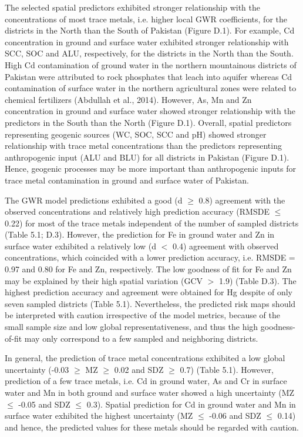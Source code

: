 The selected spatial predictors exhibited stronger relationship with the concentrations of most trace metals, i.e. higher local GWR coefficients, for the districts in the North than the South of Pakistan (Figure D.1). For example, Cd concentration in ground and surface water exhibited stronger relationship with SCC, SOC and ALU, respectively, for the districts in the North than the South. High Cd contamination of ground water in the northern mountainous districts of Pakistan were attributed to rock phosphates that leach into aquifer whereas Cd contamination of surface water in the northern agricultural zones were related to chemical fertilizers (Abdullah et al., 2014). However, As, Mn and Zn concentration in ground and surface water showed stronger relationship with the predictors in the South than the North (Figure D.1). Overall, spatial predictors representing geogenic sources (WC, SOC, SCC and pH) showed stronger relationship with trace metal concentrations than the predictors representing anthropogenic input (ALU and BLU) for all districts in Pakistan (Figure D.1). Hence, geogenic processes may be more important than anthropogenic inputs for trace metal contamination in ground and surface water of Pakistan.

The GWR model predictions exhibited a good (d $\geq$ 0.8) agreement with the observed concentrations and relatively high prediction accuracy (RMSDE $\leq$ 0.22) for most of the trace metals independent of the number of sampled districts (Table 5.1; D.3). However, the prediction for Fe in ground water and Zn in surface water exhibited a relatively low (d $<$ 0.4) agreement with observed concentrations, which coincided with a lower prediction accuracy, i.e. RMSDE = 0.97 and 0.80 for Fe and Zn, respectively. The low goodness of fit for Fe and Zn may be explained by their high spatial variation (GCV $>$ 1.9) (Table D.3).  The highest prediction accuracy and agreement were obtained for Hg despite of only seven sampled districts (Table 5.1). Nevertheless, the predicted risk maps should be interpreted with caution irrespective of the model metrics, because of the small sample size and low global representativeness, and thus the high goodness-of-fit may only correspond to a few sampled and neighboring districts.

In general, the prediction of trace metal concentrations exhibited a low global uncertainty (-0.03 $\geq$ MZ $\geq$ 0.02 and SDZ $\geq$ 0.7) (Table 5.1). However, prediction of a few trace metals, i.e. Cd in ground water, As and Cr in surface water and Mn in both ground and surface water showed a high uncertainty (MZ $\leq$ -0.05 and SDZ $\leq$ 0.3). Spatial prediction for Cd in ground water and Mn in surface water exhibited the highest uncertainty (MZ $\leq$ -0.06 and SDZ $\leq$ 0.14) and hence, the predicted values for these metals should be regarded with caution.

